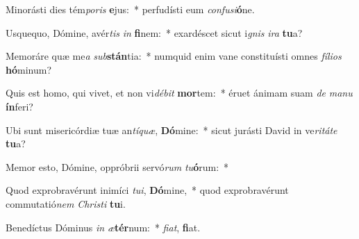 \item Minorásti dies tém\textit{po}\textit{ris} \textbf{e}jus:~* perfudísti eum \textit{con}\textit{fu}\textit{si}\textbf{ó}ne.
\item Usquequo, Dómine, avér\textit{tis} \textit{in} \textbf{fi}nem:~* exardéscet sicut i\textit{gnis} \textit{i}\textit{ra} \textbf{tu}a?
\item Memoráre quæ me\textit{a} \textit{sub}\textbf{stán}tia:~* numquid enim vane constituísti omnes \textit{fí}\textit{li}\textit{os} \textbf{hó}minum?
\item Quis est homo, qui vivet, et non vi\textit{dé}\textit{bit} \textbf{mor}tem:~* éruet ánimam suam \textit{de} \textit{ma}\textit{nu} \textbf{ín}feri?
\item Ubi sunt misericórdiæ tuæ an\textit{tí}\textit{quæ}, \textbf{Dó}mine:~* sicut jurásti David in ve\textit{ri}\textit{tá}\textit{te} \textbf{tu}a?
\item Memor esto, Dómine, oppróbrii servó\textit{rum} \textit{tu}\textbf{ó}rum:~* 
\item Quod exprobravérunt inimíci \textit{tu}\textit{i}, \textbf{Dó}mine,~* quod exprobravérunt commutatió\textit{nem} \textit{Chris}\textit{ti} \textbf{tu}i.
\item Benedíctus Dóminus \textit{in} \textit{æ}\textbf{tér}num:~* \textit{fi}\textit{at}, \textbf{fi}at.

